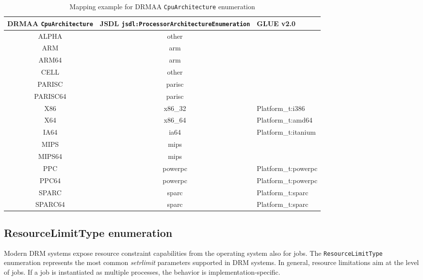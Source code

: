 \documentclass{article}
\newcommand{\h}[1]{\lstinline|#1|}
\newcommand{\rat}[1]{}
\begin{document}
\rat{This kind of reporting is the only one that makes sense from the application point of view. The Nov 30th 2011 conf call clarified that CPU speed is intentionally left out in DRMAAv2.}

\begin{table}[ht]
\centering
\begin{tabularx}{\textwidth}{|c|c|X|}
\hline
DRMAA \h{CpuArchitecture} & JSDL \h{jsdl:ProcessorArchitectureEnumeration} & GLUE v2.0 \\
\hline
ALPHA		&	other & \\
ARM			&	arm & \\
ARM64		&	arm & \\
CELL		&	other & \\
PARISC		&	parisc & \\
PARISC64	&	parisc & \\
X86			&	x86\_32 & Platform\_t:i386 \\
X64			&	x86\_64 & Platform\_t:amd64 \\
IA64		&	ia64 & Platform\_t:itanium \\
MIPS		&	mips & \\
MIPS64		&	mips & \\
PPC			&	powerpc & Platform\_t:powerpc \\
PPC64		&	powerpc & Platform\_t:powerpc \\
SPARC		&	sparc & Platform\_t:sparc \\
SPARC64		&	sparc & Platform\_t:sparc \\
\hline
\end{tabularx}
\caption{Mapping example for DRMAA \h{CpuArchitecture} enumeration}
\label{tab:cpumappings}
\end{table}

\subsection{ResourceLimitType enumeration}
\label{sec:resourcelimittype}

Modern DRM systems expose resource constraint capabilities from the operating system also for jobs. The \h{ResourceLimitType} enumeration represents the most common \emph{setrlimit} parameters \cite{posixutils} supported in DRM systems. In general, resource limitations aim at the level of jobs. If a job is instantiated as multiple processes, the behavior is implementation-specific.

\rat{
The June 2011 face-to-face meeting had hard discussion on the relation between operating system processes, jobs, and slots. It was decided that slot is a truly opaque concept, which means that you cannot do resource constraints on something that is implementation-specific. Therefore, the spec semantics must focus on jobs only, and leave the interpretation to the DRM system / DRMAA implementation.This leads to some intentional fuzzying of descriptions for ResourceLimitType members.
}
\end{document}
